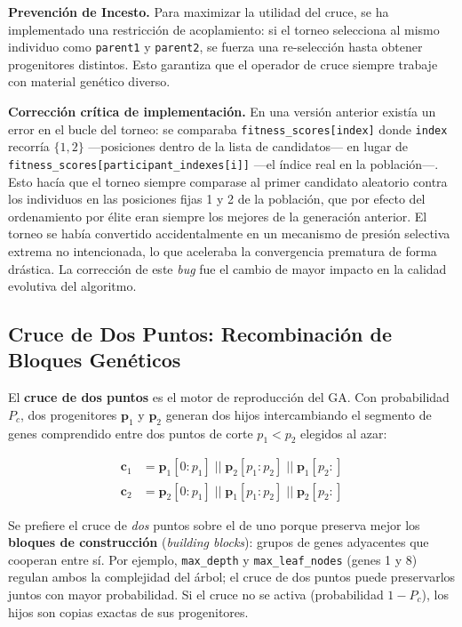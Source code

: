 \documentclass[12pt, a4paper]{article}
\begin{document}
\textbf{Prevención de Incesto.} Para maximizar la utilidad del cruce, se ha implementado
una restricción de acoplamiento: si el torneo selecciona al mismo individuo como
\texttt{parent1} y \texttt{parent2}, se fuerza una re-selección hasta obtener progenitores
distintos. Esto garantiza que el operador de cruce siempre trabaje con material
genético diverso.

\textbf{Corrección crítica de implementación.} En una versión anterior existía un error
en el bucle del torneo: se comparaba \texttt{fitness\_scores[index]} donde \texttt{index}
recorría $\{1, 2\}$ ---posiciones dentro de la lista de candidatos--- en lugar de
\texttt{fitness\_scores[participant\_indexes[i]]} ---el índice real en la población---.
Esto hacía que el torneo siempre comparase al primer candidato aleatorio contra los
individuos en las posiciones fijas 1 y 2 de la población, que por efecto del ordenamiento
por élite eran siempre los mejores de la generación anterior. El torneo se había
convertido accidentalmente en un mecanismo de presión selectiva extrema no intencionada,
lo que aceleraba la convergencia prematura de forma drástica. La corrección de este \textit{bug}
fue el cambio de mayor impacto en la calidad evolutiva del algoritmo.

\subsection{Cruce de Dos Puntos: Recombinación de Bloques Genéticos}

El \textbf{cruce de dos puntos} es el motor de reproducción del GA. Con probabilidad $P_c$,
dos progenitores $\mathbf{p}_1$ y $\mathbf{p}_2$ generan dos hijos intercambiando
el segmento de genes comprendido entre dos puntos de corte $p_1 < p_2$ elegidos al azar:

\begin{align}
  \mathbf{c}_1 & = \mathbf{p}_1[0{:}p_1] \;||\; \mathbf{p}_2[p_1{:}p_2] \;||\; \mathbf{p}_1[p_2{:}] \\
  \mathbf{c}_2 & = \mathbf{p}_2[0{:}p_1] \;||\; \mathbf{p}_1[p_1{:}p_2] \;||\; \mathbf{p}_2[p_2{:}]
\end{align}

Se prefiere el cruce de \emph{dos} puntos sobre el de uno porque preserva mejor los
\textbf{bloques de construcción} (\textit{building blocks}): grupos de genes adyacentes
que cooperan entre sí. Por ejemplo, \texttt{max\_depth} y \texttt{max\_leaf\_nodes}
(genes 1 y 8) regulan ambos la complejidad del árbol; el cruce de dos puntos puede
preservarlos juntos con mayor probabilidad. Si el cruce no se activa (probabilidad
$1-P_c$), los hijos son copias exactas de sus progenitores.
\end{document}
